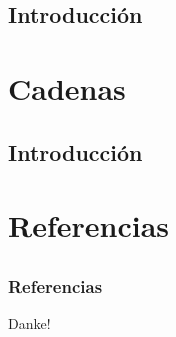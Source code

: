 \documentclass{beamer}
\begin{document}
\subsection{Introducci\'on}

\section{Cadenas}
\subsection{Introducci\'on}

\section{Referencias}
\subsection{}
\begin{frame}[allowframebreaks]
    
    \frametitle{Referencias}
    
    
\end{frame}

\begin{frame}
    \begin{center}
        {\Huge\calligra Danke!}
    \end{center}
\end{frame}
\end{document}

